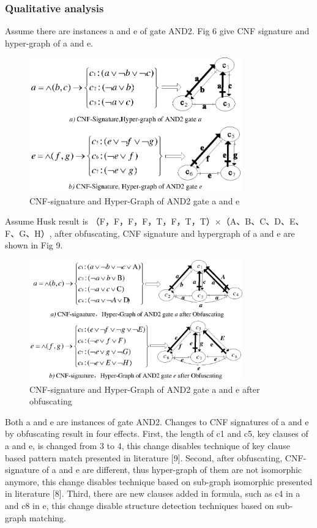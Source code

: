 \documentclass[runningheads,a4paper]{llncs}
\begin{document}
\subsubsection{Qualitative analysis}
Assume there are instances a and e of gate AND2. Fig 6 give CNF signature and hyper-graph of a and e.
\begin{figure}
\centering
\includegraphics[width=9.2cm]{a6}
\caption{CNF-signature and Hyper-Graph of AND2 gate a and e}
\label{fig:example}
\end{figure}
Assume Husk result is {（F，F，F，F，T，F，T，T）×（A、B、C、D、E、F、G、H）}, after obfuscating, CNF signature and hypergraph of a and e are shown in Fig 9.
\begin{figure}
\centering
\includegraphics[width=9.2cm]{a7}
\caption{CNF-signature and Hyper-Graph of AND2 gate a and e after obfuscating}
\label{fig:example}
\end{figure}
Both a and e are instances of gate AND2. Changes to CNF signatures of a and e by obfuscating result in four effects. First, the length of c1 and c5, key clauses of a and e, is changed from 3 to 4, this change disables technique of key clause based pattern match presented in literature [9]. Second, after obfuscating, CNF-signature of a and e are different, thus hyper-graph of them are not isomorphic anymore, this change disables technique based on sub-graph isomorphic presented in literature [8]. Third, there are new clauses added in formula, such as c4 in a and c8 in e, this change disable structure detection techniques based on sub-graph matching. 
\end{document}
